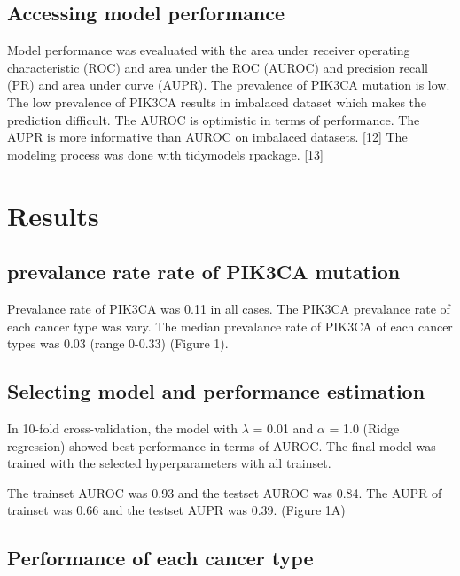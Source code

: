 \documentclass[10pt,letterpaper]{article}
\begin{document}
\hypertarget{accessing-model-performance}{%
\subsection{Accessing model
performance}\label{accessing-model-performance}}

Model performance was evealuated with the area under receiver operating
characteristic (ROC) and area under the ROC (AUROC) and precision recall
(PR) and area under curve (AUPR). The prevalence of PIK3CA mutation is
low. The low prevalence of PIK3CA results in imbalaced dataset which
makes the prediction difficult. The AUROC is optimistic in terms of
performance. The AUPR is more informative than AUROC on imbalaced
datasets. {[}12{]} The modeling process was done with tidymodels
rpackage. {[}13{]}

\hypertarget{results}{%
\section{Results}\label{results}}

\hypertarget{prevalance-rate-rate-of-pik3ca-mutation}{%
\subsection{prevalance rate rate of PIK3CA
mutation}\label{prevalance-rate-rate-of-pik3ca-mutation}}

Prevalance rate of PIK3CA was 0.11 in all cases. The PIK3CA prevalance
rate of each cancer type was vary. The median prevalance rate of PIK3CA
of each cancer types was 0.03 (range 0-0.33) (Figure 1).

\hypertarget{selecting-model-and-performance-estimation}{%
\subsection{Selecting model and performance
estimation}\label{selecting-model-and-performance-estimation}}

In 10-fold cross-validation, the model with \(\lambda\) = 0.01 and
\(\alpha\) = 1.0 (Ridge regression) showed best performance in terms of
AUROC. The final model was trained with the selected hyperparameters
with all trainset.

The trainset AUROC was 0.93 and the testset AUROC was 0.84. The AUPR of
trainset was 0.66 and the testset AUPR was 0.39. (Figure 1A)

\hypertarget{performance-of-each-cancer-type}{%
\subsection{Performance of each cancer
type}\label{performance-of-each-cancer-type}}
\end{document}
